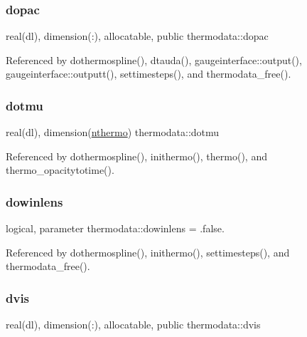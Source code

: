 \subsubsection{\texorpdfstring{dopac}{dopac}}
{\footnotesize\ttfamily real(dl), dimension(\+:), allocatable, public thermodata\+::dopac}



Referenced by dothermospline(), dtauda(), gaugeinterface\+::output(), gaugeinterface\+::outputt(), settimesteps(), and thermodata\+\_\+free().

\mbox{\label{namespacethermodata_aa46effcfaebc414efc1483613c20938b}} 
\subsubsection{\texorpdfstring{dotmu}{dotmu}}
{\footnotesize\ttfamily real(dl), dimension(\mbox{\hyperlink{namespacethermodata_ab5a6325bede2b0cce4e867e9e1e18215}{nthermo}}) thermodata\+::dotmu\hspace{0.3cm}{\ttfamily [private]}}



Referenced by dothermospline(), inithermo(), thermo(), and thermo\+\_\+opacitytotime().

\mbox{\label{namespacethermodata_a4f8d2aec0f4b6bcdc91d3d574bae3ba9}} 
\subsubsection{\texorpdfstring{dowinlens}{dowinlens}}
{\footnotesize\ttfamily logical, parameter thermodata\+::dowinlens = .false.\hspace{0.3cm}{\ttfamily [private]}}



Referenced by dothermospline(), inithermo(), settimesteps(), and thermodata\+\_\+free().

\mbox{\label{namespacethermodata_a4e5d2a5cf09e04bba23defc7dcf9e967}} 
\subsubsection{\texorpdfstring{dvis}{dvis}}
{\footnotesize\ttfamily real(dl), dimension(\+:), allocatable, public thermodata\+::dvis}



